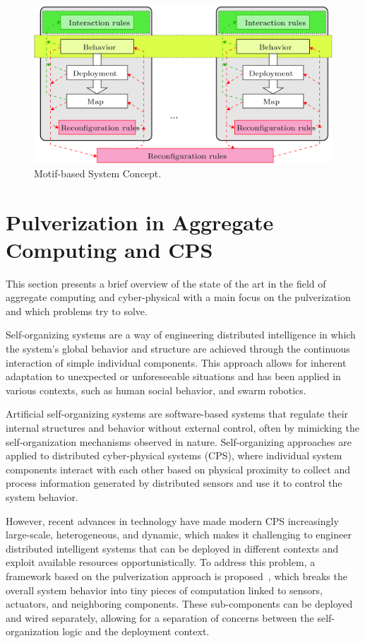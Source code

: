 \begin{figure}
	\centering
	\includegraphics[width=0.8\linewidth]{figures/motif-concept.png}
	\caption{Motif-based System Concept.}
	\label{fig:motif-concept}
\end{figure}


\section{Pulverization in Aggregate Computing and CPS}
\label{sec:pulverization-aggregate-computing-cps}

This section presents a brief overview of the state of the art in the field of aggregate computing and cyber-physical with a main focus on the
pulverization and which problems try to solve.

Self-organizing systems are a way of engineering distributed intelligence in which the system's global behavior and structure are achieved through
the continuous interaction of simple individual components. This approach allows for inherent adaptation to unexpected or unforeseeable situations
and has been applied in various contexts, such as human social behavior, and swarm robotics.

Artificial self-organizing systems are software-based systems that regulate their internal structures and behavior without external control, often by
mimicking the self-organization mechanisms observed in nature. Self-organizing approaches are applied to distributed cyber-physical systems (CPS),
where individual system components interact with each other based on physical proximity to collect and process information generated by distributed
sensors and use it to control the system behavior.

However, recent advances in technology have made modern CPS increasingly large-scale, heterogeneous, and dynamic, which makes it challenging to
engineer distributed intelligent systems that can be deployed in different contexts and exploit available resources opportunistically. To address
this problem, a framework based on the pulverization approach is proposed~\cite{fi12110203}, which breaks the overall system behavior into tiny
pieces of computation linked to sensors, actuators, and neighboring components. These sub-components can be deployed and wired separately, allowing
for a separation of concerns between the self-organization logic and the deployment context.


